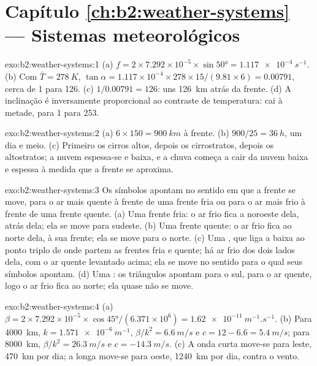 \section*{Capítulo \ref{ch:b2:weather-systems} --- Sistemas meteorológicos}

\begin{solution}{exo:b2:weather-systems:1}
(a) $f = 2 \times 7.292 \times 10^{-5} \times \sin\ang{50} = \qty{1.117e-4}{s^{-1}}$. (b) Com
$\bar T = \qty{278}{K}$, $\tan\alpha = 1.117 \times 10^{-4} \times 278 \times 15/(9.81 \times 6)
= 0.00791$, cerca de 1 para 126. (c) $1/0.00791 = 126$: uns \qty{126}{km} atrás da frente. (d) A
inclinação é inversamente proporcional ao contraste de temperatura: cai à metade, para 1 para 253.
\end{solution}

\begin{solution}{exo:b2:weather-systems:2}
(a) $6 \times 150 = \qty{900}{km}$ à frente. (b) $900/25 = \qty{36}{h}$, um dia e meio. (c) Primeiro
os cirros altos, depois os cirrostratos, depois os altostratos; a nuvem espessa-se e baixa, e a chuva
começa a cair da nuvem baixa e espessa à medida que a frente se aproxima.
\end{solution}

\begin{solution}{exo:b2:weather-systems:3}
Os símbolos apontam no sentido em que a frente se move, para o ar mais quente à frente de uma frente fria ou para o
ar mais frio à frente de uma frente quente. (a) Uma frente fria: o ar frio fica a noroeste dela, atrás
dela; ela se move para sudeste. (b) Uma frente quente: o ar frio fica ao norte dela, à sua frente; ela se move para
o norte. (c) Uma , que liga a baixa ao ponto triplo de onde partem as frentes fria e
quente; há ar frio dos dois lados dela, com o ar quente levantado acima; ela se move no sentido para o qual seus
símbolos apontam. (d) Uma : os triângulos apontam para o sul, para o ar quente, logo o ar
frio fica ao norte; ela quase não se move.
\end{solution}

\begin{solution}{exo:b2:weather-systems:4}
(a) $\beta = 2 \times 7.292 \times 10^{-5} \times \cos\ang{45}/(6.371 \times 10^6) =
\qty{1.62e-11}{m^{-1}.s^{-1}}$. (b) Para \qty{4000}{km}, $k = \qty{1.571e-6}{m^{-1}}$, $\beta/k^2 =
\qty{6.6}{m/s}$ e $c = 12 - 6.6 = \qty{5.4}{m/s}$; para \qty{8000}{km}, $\beta/k^2 =
\qty{26.3}{m/s}$ e $c = \qty{-14.3}{m/s}$. (c) A onda curta move-se para leste, \qty{470}{km} por dia;
a longa move-se para oeste, \qty{1240}{km} por dia, contra o vento.
\end{solution}

